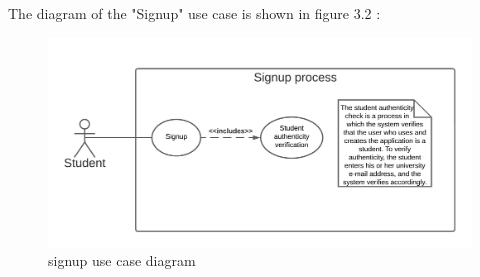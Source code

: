 The diagram of the "Signup" use case is shown in figure 3.2 :

\begin{figure}[H] 
            \centering
            \includegraphics[scale=0.9]{diagrams/refined use case signup.png}
            \caption{signup use case diagram} 
            \label{fig: signup use case diagram}
\end{figure}

